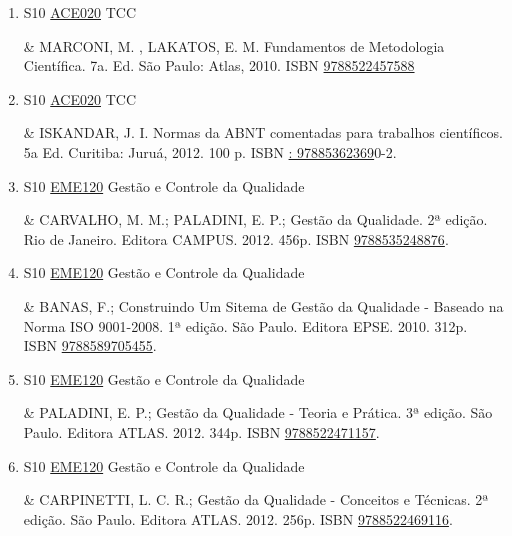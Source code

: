 \documentclass[12pt,a4paper]{book}
\begin{document}
\begin{enumerate}
 \item S10 \hyperref[PUD:ACE020]{ACE020} TCC

& MARCONI, M. , LAKATOS, E.  M.  Fundamentos de Metodologia Científica.  7a.  Ed.  São Paulo: Atlas, 2010.  ISBN \href{http://www.bn.br/site/pages/servicosProfissionais/agenciaISBN/isbnBusca/FbnBuscaISBNCatalogo.asp?pField=ISBN&pIntPagina=1&pISBN=22457588&nidbISBN=true&hidbISBN=true}{9788522457588}
 

 \item S10 \hyperref[PUD:ACE020]{ACE020} TCC

&  ISKANDAR, J.  I.  Normas da ABNT comentadas para trabalhos científicos.  5a Ed.  Curitiba: Juruá, 2012.  100 p.  ISBN \href{http://www.google.com/search?hl=pt-BR&tbo=p&tbm=bks&q=isbn:: 97885362369&num=10}{: 97885362369}0-2.
 \item S10 \hyperref[PUD:EME120]{EME120} Gestão e Controle da Qualidade

&  CARVALHO, M.  M.;  PALADINI, E.  P.;  Gestão da Qualidade.  2ª edição.  Rio de Janeiro.  Editora CAMPUS.  2012.  456p.  ISBN \href{http://www.bn.br/site/pages/servicosProfissionais/agenciaISBN/isbnBusca/FbnBuscaISBNCatalogo.asp?pField=ISBN&pIntPagina=1&pISBN=35248876&nidbISBN=true&hidbISBN=true}{9788535248876}. 
 

 \item S10 \hyperref[PUD:EME120]{EME120} Gestão e Controle da Qualidade

&  BANAS, F.;  Construindo Um Sitema de Gestão da Qualidade - Baseado na Norma ISO 9001-2008.  1ª edição.  São Paulo.  Editora EPSE.  2010.  312p.  ISBN \href{http://www.bn.br/site/pages/servicosProfissionais/agenciaISBN/isbnBusca/FbnBuscaISBNCatalogo.asp?pField=ISBN&pIntPagina=1&pISBN=89705455&nidbISBN=true&hidbISBN=true}{9788589705455}. 
 

 \item S10 \hyperref[PUD:EME120]{EME120} Gestão e Controle da Qualidade

&  PALADINI, E.  P.;  Gestão da Qualidade - Teoria e Prática.  3ª edição.  São Paulo.  Editora ATLAS.  2012.  344p.  ISBN \href{http://www.bn.br/site/pages/servicosProfissionais/agenciaISBN/isbnBusca/FbnBuscaISBNCatalogo.asp?pField=ISBN&pIntPagina=1&pISBN=22471157&nidbISBN=true&hidbISBN=true}{9788522471157}.
 \item S10 \hyperref[PUD:EME120]{EME120} Gestão e Controle da Qualidade

&  CARPINETTI, L.  C.  R.;  Gestão da Qualidade - Conceitos e Técnicas.  2ª edição.  São Paulo.  Editora ATLAS.  2012.  256p.  ISBN \href{http://www.bn.br/site/pages/servicosProfissionais/agenciaISBN/isbnBusca/FbnBuscaISBNCatalogo.asp?pField=ISBN&pIntPagina=1&pISBN=22469116&nidbISBN=true&hidbISBN=true}{9788522469116}. 
 


\end{enumerate}
\end{document}
